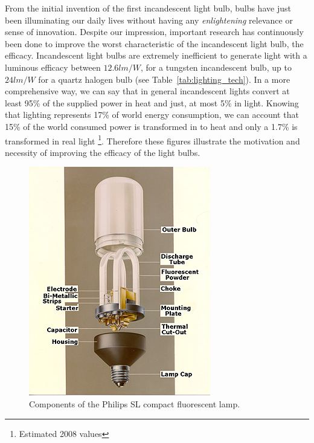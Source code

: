 From the initial invention of the first incandescent light bulb,  bulbs have just been illuminating our daily lives without having  any \emph{enlightening} relevance or sense of innovation. Despite our impression,  important research has continuously been done to improve the worst characteristic of the incandescent light bulb, the efficacy. Incandescent light bulbs are extremely inefficient to generate light with a luminous efficacy between $12.6 lm/W$, for a tungsten incandescent bulb, up to $24 lm/W$ for a quartz halogen bulb (see Table~\ref{tab:lighting_tech}). In a more comprehensive way, we can say that in general incandescent lights convert at least 95\% of the supplied power in heat and just, at most 5\% in light. Knowing that lighting represents 17\% of world energy consumption, we can account that 15\% of the world consumed power is transformed in to heat and only a 1.7\% is transformed in real light \footnote{Estimated 2008 values}. Therefore these figures illustrate  the motivation and necessity of improving the efficacy of the light bulbs.

\begin{figure}[!h]
\centering
\includegraphics{./0_intro/img/phil1b.jpg}
\caption{Components of the Philips SL compact fluorescent lamp. }
\label{fig:philips_sl}
\end{figure}

